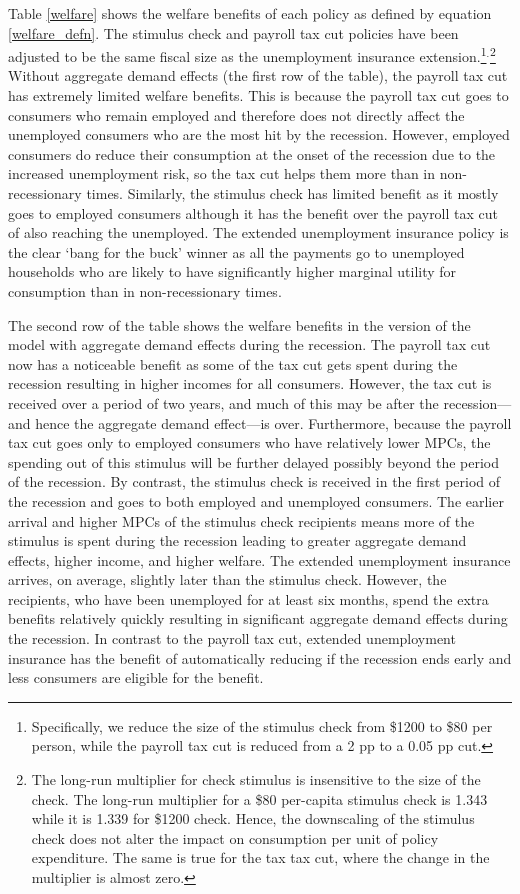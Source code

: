 \documentclass[../HAFiscal]{subfiles}
\begin{document}
Table \ref{welfare} shows the welfare benefits of each policy as defined by equation \eqref{welfare_defn}. The stimulus check and payroll tax cut policies have been adjusted to be the same fiscal size as the unemployment insurance extension.\footnote{Specifically, we reduce the size of the stimulus check from \$1200 to \$80 per person, while the payroll tax cut is reduced from a 2 pp to a 0.05 pp cut.}$^.$\footnote{The long-run multiplier for check stimulus is insensitive to the size of the check. The long-run multiplier for a \$80 per-capita stimulus check is 1.343 while it is 1.339 for \$1200 check. Hence, the downscaling of the stimulus check does not alter the impact on consumption per unit of policy expenditure. The same is true for the tax tax cut, where the change in the multiplier is almost zero.} Without aggregate demand effects (the first row of the table), the payroll tax cut has extremely limited welfare benefits. This is because the payroll tax cut goes to consumers who remain employed and therefore does not directly affect the unemployed consumers who are the most hit by the recession. However, employed consumers do reduce their consumption at the onset of the recession due to the increased unemployment risk, so the tax cut helps them more than in non-recessionary times.  Similarly, the stimulus check has limited benefit as it mostly goes to employed consumers although it has the benefit over the payroll tax cut of also reaching the unemployed. The extended unemployment insurance policy is the clear `bang for the buck' winner as all the payments go to unemployed households who are likely to have significantly higher marginal utility for consumption than in non-recessionary times.

The second row of the table shows the welfare benefits in the version of the model with aggregate demand effects during the recession. The payroll tax cut now has a noticeable benefit as some of the tax cut gets spent during the recession resulting in higher incomes for all consumers. However, the tax cut is received over a period of two years, and much of this may be after the recession---and hence the aggregate demand effect---is over. Furthermore, because the payroll tax cut goes only to employed consumers who have relatively lower MPCs, the spending out of this stimulus will be further delayed possibly beyond the period of the recession. By contrast, the stimulus check is received in the first period of the recession and goes to both employed and unemployed consumers. The earlier arrival and higher MPCs of the stimulus check recipients means more of the stimulus is spent during the recession leading to greater aggregate demand effects, higher income, and higher welfare. The extended unemployment insurance arrives, on average, slightly later than the stimulus check. However, the recipients, who have been unemployed for at least six months, spend the extra benefits relatively quickly resulting in significant aggregate demand effects during the recession. In contrast to the payroll tax cut, extended unemployment insurance has the benefit of automatically reducing if the recession ends early and less consumers are eligible for the benefit.
\end{document}
